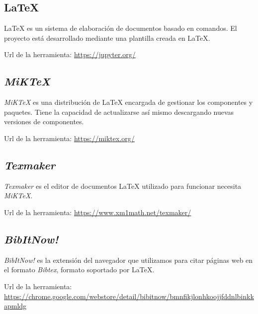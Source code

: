 \subsection{\LaTeX}
\LaTeX{} es un sistema de elaboración de documentos basado en comandos. El proyecto está desarrollado mediante una plantilla creada en \LaTeX.

Url de la herramienta: \url{https://jupyter.org/}

\subsection{\textit{MiKTeX}}
\textit{MiKTeX} es una distribución de \LaTeX{} encargada de gestionar los componentes y paquetes. Tiene la capacidad de actualizarse así mismo descargando nuevas versiones de componentes.

Url de la herramienta: \url{https://miktex.org/}

\subsection{\textit{Texmaker}}
\textit{Texmaker} es el editor de documentos \LaTeX{} utilizado para funcionar necesita \textit{MiKTeX}.

Url de la herramienta: \url{https://www.xm1math.net/texmaker/}

\subsection{\textit{BibItNow!}}
\textit{BibItNow!} es la extensión del navegador que utilizamos para citar páginas web en el formato \textit{Bibtex}, formato soportado por \LaTeX.

Url de la herramienta: \url{https://chrome.google.com/webstore/detail/bibitnow/bmnfikjlonhkoojjfddnlbinkkapmldg}
